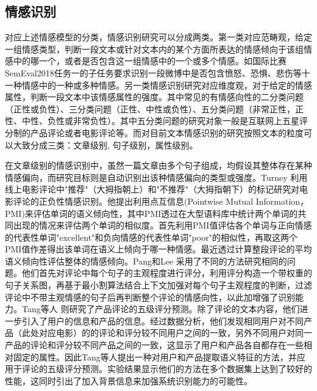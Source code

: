 \subsection{情感识别}

对应上述情感模型的分类，情感识别研究可以分成两类。第一类对应范畴观，给定一组情感类型，判断一段文本或针对文本内的某个方面所表达的情感倾向于该组情感中的哪一个，或者是否包含这一组情感中的一个或多个情感。如国际比赛SemEval2018任务一\cite{mohammad2018semeval}的子任务要求识别一段微博中是否包含愤怒、恐惧、悲伤等十一种情感中的一种或多种情感。另一类情感识别研究对应维度观，对于给定的情感属性，判断一段文本中该情感属性的强度。其中常见的有情感向性的二分类问题（正性或负性）、三分类问题（正性、中性或负性）、五分类问题（非常正性，正性、中性、负性或非常负性）。其中五分类问题的研究对象一般是互联网上五星评分制的产品评论或者电影评论等。而对目前文本情感识别的研究按照文本的粒度可以大致分成三类：文章级别, 句子级别，属性级别。

在文章级别的情感识别中，虽然一篇文章由多个句子组成，均假设其整体存在某种情感偏向，而研究目标则是自动识别出该种情感偏向的类型或强度。Turney \cite{turney2002thumbs} 利用线上电影评论中"推荐"（大拇指朝上）和"不推荐"（大拇指朝下）的标记研究对电影评论的正负性情感识别。他提出利用点互信息(Pointwise Mutual Information，PMI)来评估单词的语义倾向性，其中PMI透过在大型语料库中统计两个单词的共同出现的情况来评估两个单词的相似度。首先利用PMI值评估各个单词与正向情感的代表性单词"excellent"和负向情感的代表性单词"poor"的相似性，再取这两个PMI值作差得出该单词在语义上倾向于哪一种情感。最近透过计算整段评论的平均语义倾向性评估整体的情感倾向。Pang和Lee \cite{pang2004sentimental} 采用了不同的方法研究相同的问题。他们首先对评论中每个句子的主观程度进行评分，利用评分构造一个带权重的句子关系图，再基于最小割算法结合上下文加强对每个句子主观程度的判断，过滤评论中不带主观情感的句子后再判断整个评论的情感向性，以此加增强了识别能力。Tang等人 \cite{tang2015learning} 则研究了产品评论的五级评分预测。除了评论的文本内容，他们进一步引入了用户的信息和产品的信息。经过数据分析，他们发现相同用户对不同产品（此处对应电影）的的评论和评分较不同用户之间的一致，另外不同用户对同一产品的评论和评分较不同产品之间的一致，这显示了用户和产品各自都存在一些相对固定的属性。因此Tang等人提出一种对用户和产品提取语义特征的方法，并应用于评论的五级评分预测。实验结果显示他们的方法在多个数据集上达到了较好的性能，这同时引出了加入背景信息来加强系统识别能力的可能性。

